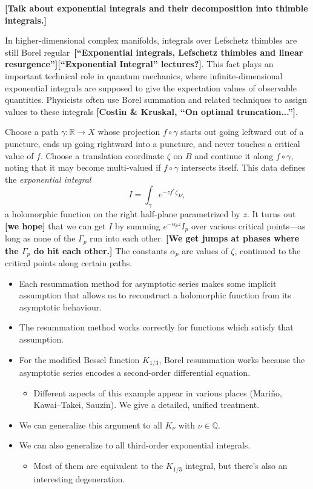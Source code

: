 \documentclass{article}
\newcommand{\maps}{\colon}
\newcommand{\R}{\mathbb{R}}
\begin{document}
\begin{itemize}
\textbf{[Talk about exponential integrals and their decomposition into thimble integrals.]}

In higher-dimensional complex manifolds, integrals over Lefschetz thimbles are still Borel regular~\textbf{[``Exponential integrals, Lefschetz thimbles and linear resurgence''][``Exponential Integral'' lectures?]}. This fact plays an important technical role in quantum mechanics, where infinite-dimensional exponential integrals are supposed to give the expectation values of observable quantities. Physicists often use Borel summation and related techniques to assign values to these integrals \textbf{[Costin \& Kruskal, ``On optimal truncation...'']}.

\color{DarkTurquoise}
Choose a path $\gamma \maps \R \to X$ whose projection $f \circ \gamma$ starts out going leftward out of a puncture, ends up going rightward into a puncture, and never touches a critical value of $f$. Choose a translation coordinate $\zeta$ on $B$ and continue it along $f \circ \gamma$, noting that it may become multi-valued if $f \circ \gamma$ intersects itself. This data defines the {\em exponential integral}
\[ I = \int_\gamma e^{-z f^*\zeta} \nu, \]
a holomorphic function on the right half-plane parametrized by $z$. It turns out \textbf{[we hope]} that we can get $I$ by summing $e^{-\alpha_p z} I_p$ over various critical points---as long as none of the $\Gamma_p$ run into each other. \textbf{[We get jumps at phases where the $\Gamma_p$ do hit each other.]} The constants $\alpha_p$ are values of $\zeta$, continued to the critical points along certain paths.
\color{black}
\end{itemize}
\begin{itemize}
\item Each resummation method for asymptotic series makes some implicit assumption that allows us to reconstruct a holomorphic function from its asymptotic behaviour.
\item The resummation method works correctly for functions which satisfy that assumption.
\item For the modified Bessel function $K_{1/3}$, Borel resummation works because the asymptotic series encodes a second-order differential equation.
\begin{itemize}
\item Different aspects of this example appear in various places (Mari\~{n}o, Kawai--Takei, Sauzin). We give a detailed, unified treatment.
\end{itemize}
\item We can generalize this argument to all $K_\nu$ with $\nu \in \mathbb{Q}$.
\item We can also generalize to all third-order exponential integrals.
\begin{itemize}
\item Most of them are equivalent to the $K_{1/3}$ integral, but there's also an interesting degeneration.
\end{itemize}
\end{itemize}
\color{black}
\end{document}
